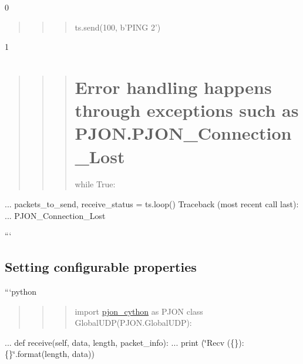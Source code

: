0 \begin{quotation}
\begin{quotation}
\begin{quotation}
ts.\-send(100, b'P\-I\-N\-G 2')

\end{quotation}


\end{quotation}


\end{quotation}
1 \begin{quotation}
\begin{quotation}
\begin{quotation}
\section*{Error handling happens through exceptions such as P\-J\-O\-N.\-P\-J\-O\-N\-\_\-\-Connection\-\_\-\-Lost}

while True\-:

\end{quotation}


\end{quotation}


\end{quotation}
... packets\-\_\-to\-\_\-send, receive\-\_\-status = ts.\-loop() Traceback (most recent call last)\-: ... P\-J\-O\-N\-\_\-\-Connection\-\_\-\-Lost

```

\subsection*{Setting configurable properties}

```python \begin{quotation}
\begin{quotation}
\begin{quotation}
import \hyperlink{namespacepjon__cython}{pjon\-\_\-cython} as P\-J\-O\-N class Global\-U\-D\-P(P\-J\-O\-N.\-Global\-U\-D\-P)\-:

\end{quotation}


\end{quotation}


\end{quotation}
... def receive(self, data, length, packet\-\_\-info)\-: ... print (\char`\"{}\-Recv (\{\})\-: \{\}\char`\"{}.format(length, data))

